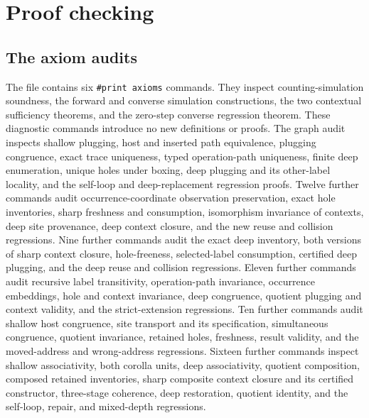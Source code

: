 \section{Proof checking}
\subsection{The axiom audits}
The file  contains six
\texttt{\#print axioms} commands. They inspect counting-simulation soundness,
the forward and converse simulation constructions, the two contextual sufficiency
theorems, and the zero-step converse regression theorem. These diagnostic commands
introduce no new definitions or proofs.
The graph audit inspects shallow plugging, host and inserted path equivalence,
plugging congruence, exact trace uniqueness, typed operation-path uniqueness,
finite deep enumeration, unique holes under boxing, deep plugging and its other-label
locality, and the self-loop and deep-replacement regression proofs. Twelve further commands
audit occurrence-coordinate observation preservation, exact hole inventories,
sharp freshness and consumption, isomorphism invariance of contexts, deep site
provenance, deep context closure, and the new reuse and collision regressions.
Nine further commands audit the exact deep inventory, both versions of sharp
context closure, hole-freeness, selected-label consumption, certified deep
plugging, and the deep reuse and collision regressions.
Eleven further commands audit recursive label transitivity, operation-path
invariance, occurrence embeddings, hole and context invariance, deep congruence,
quotient plugging and context validity, and the strict-extension regressions.
Ten further commands audit shallow host congruence, site transport and its
specification, simultaneous congruence, quotient invariance, retained holes,
freshness, result validity, and the moved-address and wrong-address regressions.
Sixteen further commands inspect shallow associativity, both corolla units,
deep associativity, quotient composition, composed retained inventories, sharp
composite context closure and its certified constructor, three-stage coherence,
deep restoration, quotient identity, and the self-loop, repair, and mixed-depth
regressions.

